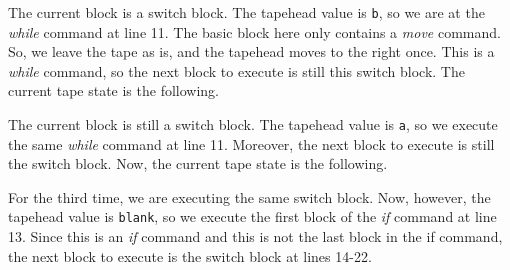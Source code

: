 \begin{figure}[H]
    \centering
\end{figure}
\noindent The current block is a switch block. The tapehead value is \texttt{b}, so we are at the \textit{while} command at line 11. The basic block here only contains a \textit{move} command. So, we leave the tape as is, and the tapehead moves to the right once. This is a \textit{while} command, so the next block to execute is still this switch block. The current tape state is the following.
\begin{figure}[H]
    \centering
\end{figure}
\noindent The current block is still a switch block. The tapehead value is \texttt{a}, so we execute the same \textit{while} command at line 11. Moreover, the next block to execute is still the switch block. Now, the current tape state is the following.
\begin{figure}[H]
    \centering
\end{figure}
\noindent For the third time, we are executing the same switch block. Now, however, the tapehead value is \texttt{blank}, so we execute the first block of the \textit{if} command at line 13. Since this is an \textit{if} command and this is not the last block in the if command, the next block to execute is the switch block at lines 14-22.
